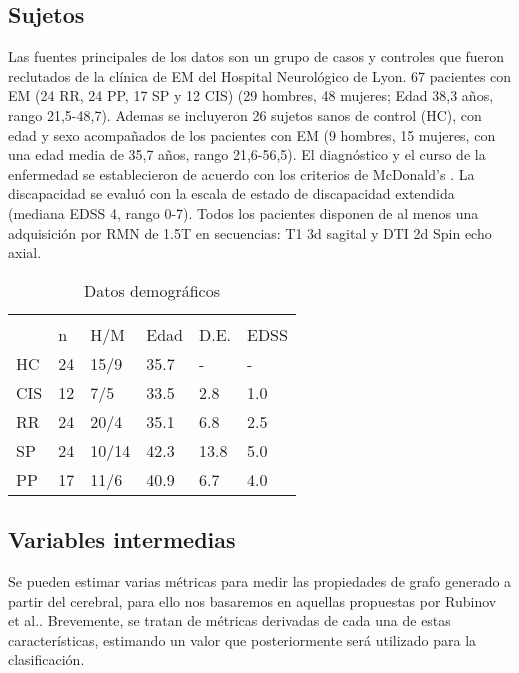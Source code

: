 \documentclass[fleqn,10pt]{UICArticle} %
\begin{document}
\subsection{Sujetos}
Las fuentes principales de los datos son un grupo de casos y controles que fueron reclutados de la clínica de EM del Hospital Neurológico de Lyon. 67 pacientes con EM (24 RR, 24 PP, 17 SP y 12 CIS) (29 hombres, 48 mujeres; Edad 38,3 años, rango 21,5-48,7). Ademas se incluyeron 26 sujetos sanos de control (HC), con edad y sexo acompañados de los pacientes con EM (9 hombres, 15 mujeres, con una edad media de 35,7 años, rango 21,6-56,5). El diagnóstico y el curso de la enfermedad se establecieron de acuerdo con los criterios de McDonald's \cite{Polman2011}. La discapacidad se evaluó con la escala de estado de discapacidad extendida (mediana EDSS 4, rango 0-7). Todos los pacientes disponen de al menos una adquisición por RMN de 1.5T en secuencias: T1 3d sagital y DTI 2d Spin echo axial.

\begin{table}[hbt]
\caption{Datos demográficos}
\centering
\begin{tabular}{llllll}
\toprule
\multicolumn{6}{l}{} \\
     & n   & H/M    & Edad  & D.E.  & EDSS  \\
HC   & 24  & 15/9   & 35.7  & -     & -     \\
CIS  & 12  & 7/5    & 33.5  & 2.8   & 1.0   \\
RR   & 24  & 20/4   & 35.1  & 6.8   & 2.5   \\
SP   & 24  & 10/14  & 42.3  & 13.8  & 5.0   \\
PP   & 17  & 11/6   & 40.9  & 6.7   & 4.0   \\
\bottomrule
\end{tabular}
\label{tab:label}
\end{table}

\subsection{Variables intermedias}
Se pueden estimar varias métricas para medir las propiedades de grafo generado a partir del cerebral, para ello nos basaremos en aquellas propuestas por Rubinov et al.\cite{Rubinov2010}. Brevemente, se tratan de métricas derivadas de cada una de estas características, estimando un valor que posteriormente será utilizado para la clasificación.
\end{document}
